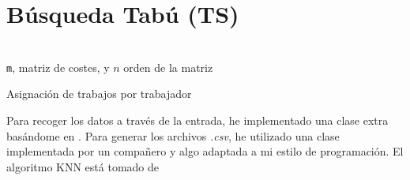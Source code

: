\documentclass[a4paper, 11pt]{article}
\begin{document}
	\section{Búsqueda Tabú (\textbf{TS})}
	\begin{algorithm}[H]
				\begin{algorithmic}[1]
					\REQUIRE \ \\
						\texttt{m}, matriz de costes, y $n$ orden de la matriz\\
			            	\ENDIF
			            \ENDIF
			          \ENDFOR
			        \ENDFOR  	
			        
				\end{algorithmic}
			    \caption{Asignación de trabajos por trabajador}
			    \label{Asignación Trabajos}
			\end{algorithm}
	
	
	
	
	
	
			Para recoger los datos a través de la entrada, he implementado una clase
			extra basándome en \cite{ARFFReader}.
			Para generar los archivos \textit{.csv}, he utilizado una clase implementada
			por un compañero y algo adaptada a mi estilo de programación.
			El algoritmo KNN está tomado de \cite{KNN}
	
	
	
			
		
\end{document}
